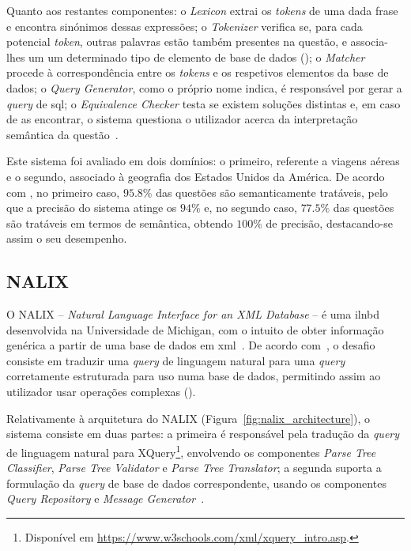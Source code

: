 Quanto aos restantes componentes: o \textit{Lexicon} extrai os \textit{tokens} de uma dada frase e encontra sinónimos dessas expressões; o \textit{Tokenizer} verifica se, para cada potencial \textit{token}, outras palavras estão também presentes na questão, e associa-lhes um um determinado tipo de elemento de base de dados (); o \textit{Matcher} procede à correspondência entre os \textit{tokens} e os respetivos elementos da base de dados; o \textit{Query Generator}, como o próprio nome indica, é responsável por gerar a \textit{query} de \gls{sql}; o \textit{Equivalence Checker} testa se existem soluções distintas e, em caso de as encontrar, o sistema questiona o utilizador acerca da interpretação semântica da questão~\parencite{towards_theory_nli_databases}.

Este sistema foi avaliado em dois domínios: o primeiro, referente a viagens aéreas e o segundo, associado à geografia dos Estados Unidos da América. De acordo com \textcite{nlidb_brief_review}, no primeiro caso, $95.8\%$ das questões são semanticamente tratáveis, pelo que a precisão do sistema atinge os $94\%$ e, no segundo caso, $77.5\%$ das questões são tratáveis em termos de semântica, obtendo $100\%$ de precisão, destacando-se assim o seu desempenho.

\subsection{NALIX}
O NALIX -- \textit{Natural Language Interface for an XML Database} -- é uma \gls{ilnbd} desenvolvida na Universidade de Michigan, com o intuito de obter informação genérica a partir de uma base de dados em \gls{xml}~\parencite{nalix_interactive_nli_querying_xml}. De acordo com~\textcite{nalix_interactive_nli_querying_xml}, o desafio consiste em traduzir uma \textit{query} de linguagem natural para uma \textit{query} corretamente estruturada para uso numa base de dados, permitindo assim ao utilizador usar operações complexas ().

Relativamente à arquitetura do NALIX (Figura~\ref{fig:nalix_architecture}), o sistema consiste em duas partes: a primeira é responsável pela tradução da \textit{query} de linguagem natural para XQuery\footnote{Disponível em \url{https://www.w3schools.com/xml/xquery_intro.asp}.}, envolvendo os componentes \textit{Parse Tree Classifier}, \textit{Parse Tree Validator} e \textit{Parse Tree Translator}; a segunda suporta a formulação da \textit{query} de base de dados correspondente, usando os componentes \textit{Query Repository} e \textit{Message Generator}~\parencite{nalix_interactive_nli_querying_xml}.

